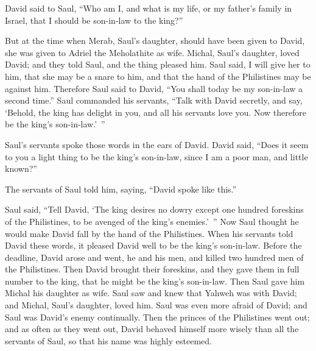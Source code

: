 {David said to Saul, “Who am I, and what is my life, or my father’s family in Israel, that I should be son-in-law to the king?”
\par }{\PP {}But at the time when Merab, Saul’s daughter, should have been given to David, she was given to Adriel the Meholathite as wife.
Michal, Saul’s daughter, loved David; and they told Saul, and the thing pleased him.
Saul said, I will give her to him, that she may be a snare to him, and that the hand of the Philistines may be against him. Therefore Saul said to David, “You shall today be my son-in-law a second time.”
Saul commanded his servants, “Talk with David secretly, and say, ‘Behold, the king has delight in you, and all his servants love you. Now therefore be the king’s son-in-law.’ ”
\par }{\PP {}Saul’s servants spoke those words in the ears of David. David said, “Does it seem to you a light thing to be the king’s son-in-law, since I am a poor man, and little known?”
\par }{\PP {}The servants of Saul told him, saying, “David spoke like this.”
\par }{\PP {}Saul said, “Tell David, ‘The king desires no dowry except one hundred foreskins of the Philistines, to be avenged of the king’s enemies.’ ” Now Saul thought he would make David fall by the hand of the Philistines.
When his servants told David these words, it pleased David well to be the king’s son-in-law. Before the deadline,
David arose and went, he and his men, and killed two hundred men of the Philistines. Then David brought their foreskins, and they gave them in full number to the king, that he might be the king’s son-in-law. Then Saul gave him Michal his daughter as wife.
Saul saw and knew that Yahweh was with David; and Michal, Saul’s daughter, loved him.
Saul was even more afraid of David; and Saul was David’s enemy continually.
Then the princes of the Philistines went out; and as often as they went out, David behaved himself more wisely than all the servants of Saul, so that his name was highly esteemed.

}

